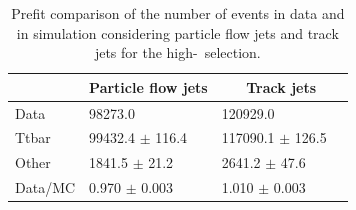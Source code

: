 \documentclass[letterpaper,12pt]{article}
\begin{document}
\begin{table}[!b]
	\centering
	\small
	\setlength\tabcolsep{5pt} 
	\begin{tabular}{|l | ll | ll |}
	\hline
	& \multicolumn{2}{c|}{Particle flow jets} & \multicolumn{2}{c|}{Track jets} \\
	\hline
	
	Data    &     98273.0              &   &    120929.0                  &   \\ 
	Ttbar   &     99432.4 $\pm$  116.4 &   &    117090.1 $\pm$      126.5 &    \\
	Other   &      1841.5 $\pm$   21.2 &   &      2641.2 $\pm$       47.6 &    \\
	Data/MC &   0.970 $\pm$ 0.003      &   &      1.010 $\pm$ 0.003       &    \\
	\hline
	  
	\end{tabular}
	\vspace{0.2cm}
	\caption{Prefit comparison of the number of events in data and in 
	simulation considering particle flow jets and track jets for the high-\pt\ 
	selection.}
	\label{tab:yields_highpT}
	\end{table}
\end{document}

